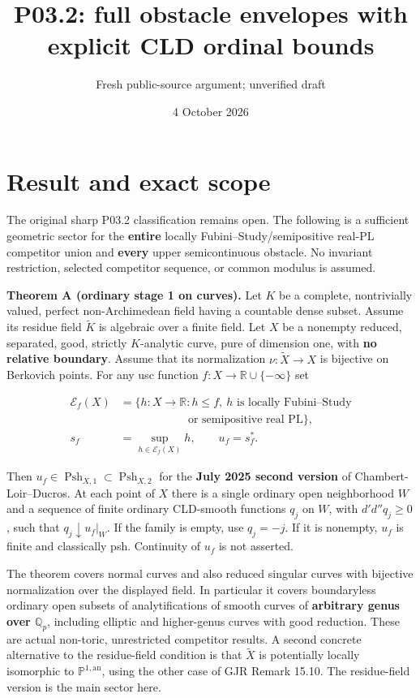 \documentclass[
  11pt,
]{article}
\title{P03.2: full obstacle envelopes with explicit CLD ordinal bounds}
\author{Fresh public-source argument; unverified draft}
\date{4 October 2026}
\begin{document}
\maketitle

\section{Result and exact scope}\label{result-and-exact-scope}

The original sharp P03.2 classification remains open. The following is a
sufficient geometric sector for the \textbf{entire} locally
Fubini--Study/semipositive real-PL competitor union and \textbf{every}
upper semicontinuous obstacle. No invariant restriction, selected
competitor sequence, or common modulus is assumed.

\textbf{Theorem A (ordinary stage 1 on curves).} Let \(K\) be a
complete, nontrivially valued, perfect non-Archimedean field having a
countable dense subset. Assume its residue field \(\widetilde K\) is
algebraic over a finite field. Let \(X\) be a nonempty reduced,
separated, good, strictly \(K\)-analytic curve, pure of dimension one,
with \textbf{no relative boundary}. Assume that its normalization
\(\nu:\widetilde X\to X\) is bijective on Berkovich points. For any usc
function \(f:X\to\mathbb R\cup\{-\infty\}\) set

\[
\begin{aligned}
\mathcal E_f(X)&=\{h:X\to\mathbb R:h\leq f,\ h\text{ is locally Fubini--Study}\\
&\hspace{6em}\text{or semipositive real PL}\},\\
s_f&=\sup_{h\in\mathcal E_f(X)}h,\qquad u_f=s_f^*.
\end{aligned}
\]

Then \(u_f\in\operatorname{Psh}_{X,1}\subset\operatorname{Psh}_{X,2}\)
for the \textbf{July 2025 second version} of Chambert-Loir--Ducros. At
each point of \(X\) there is a single ordinary open neighborhood \(W\)
and a sequence of finite ordinary CLD-smooth functions \(q_j\) on \(W\),
with \(d'd''q_j\geq0\), such that \(q_j\downarrow u_f|_W\). If the
family is empty, use \(q_j=-j\). If it is nonempty, \(u_f\) is finite
and classically psh. Continuity of \(u_f\) is not asserted.

The theorem covers normal curves and also reduced singular curves with
bijective normalization over the displayed field. In particular it
covers boundaryless ordinary open subsets of analytifications of smooth
curves of \textbf{arbitrary genus over \(\mathbb Q_p\)}, including
elliptic and higher-genus curves with good reduction. These are actual
non-toric, unrestricted competitor results. A second concrete
alternative to the residue-field condition is that \(\widetilde X\) is
potentially locally isomorphic to \(\mathbb P^{1,\mathrm{an}}\), using
the other case of GJR Remark 15.10. The residue-field version is the
main sector here.
\end{document}
